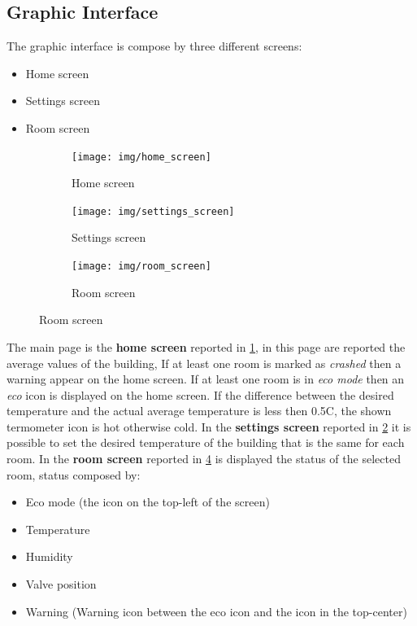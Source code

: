 \subsection{Graphic Interface}
The graphic interface is compose by three different screens:
\begin{itemize}
	\item Home screen
	\item Settings screen
	\item Room screen
\end{itemize}
\begin{figure}[H]
	\centering
	\begin{subfigure}{0.4\textwidth} %
		\texttt{[image: img/home\_screen]}
		\caption{Home screen}
		\label{fig:home_screen}
		\end{subfigure}
	\vspace{1em} %
	\begin{subfigure}{0.4\textwidth} %
		\texttt{[image: img/settings\_screen]}
		\caption{Settings screen}
		\label{fig:settings_screen}
	\end{subfigure}
	\begin{subfigure}{0.4\textwidth} %
		\texttt{[image: img/room\_screen]}
		\caption{Room screen}
		\label{fig:room_screen}
	\end{subfigure}
\end{figure}
The main page is the \textbf{home screen} reported in \ref{fig:home_screen}, in this page are reported the average values of the building,
If at least one room is marked as \textit{crashed} then a warning appear on the home screen.
If at least one room is in \textit{eco mode} then an \textit{eco} icon is displayed on the home screen.
If the difference between the desired temperature and the actual average temperature is less then 0.5C\degree, the shown termometer icon is hot otherwise cold.
In the \textbf{settings screen} reported in \ref{fig:settings_screen} it is possible to set the desired temperature of the building that is the same for each room.
In the \textbf{room screen} reported in \ref{fig:room_screen} is displayed the status of the selected room, status composed by:
\begin{itemize}
	\item Eco mode (the icon on the top-left of the screen)
	\item Temperature
	\item Humidity
	\item Valve position
	\item Warning (Warning icon between the eco icon and the icon in the top-center)
\end{itemize}
